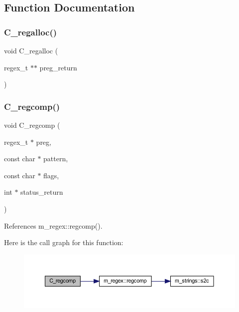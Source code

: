 \subsection{Function Documentation}
\mbox{\label{C-M__regex_8c_a749eb5df717b312d898ea0a3b279e7ca}} 
\subsubsection{\texorpdfstring{C\+\_\+regalloc()}{C\_regalloc()}}
{\footnotesize\ttfamily void C\+\_\+regalloc (\begin{DoxyParamCaption}\item[{regex\+\_\+t $\ast$$\ast$}]{preg\+\_\+return }\end{DoxyParamCaption})}

\mbox{\label{C-M__regex_8c_a3fcdbec663d5285a401e73c4cdca37be}} 
\subsubsection{\texorpdfstring{C\+\_\+regcomp()}{C\_regcomp()}}
{\footnotesize\ttfamily void C\+\_\+regcomp (\begin{DoxyParamCaption}\item[{regex\+\_\+t $\ast$}]{preg,  }\item[{const char $\ast$}]{pattern,  }\item[{const char $\ast$}]{flags,  }\item[{int $\ast$}]{status\+\_\+return }\end{DoxyParamCaption})}



References m\+\_\+regex\+::regcomp().

Here is the call graph for this function\+:
\nopagebreak
\begin{figure}[H]
\begin{center}
\leavevmode
\includegraphics[width=350pt]{C-M__regex_8c_a3fcdbec663d5285a401e73c4cdca37be_cgraph}
\end{center}
\end{figure}
\mbox{\label{C-M__regex_8c_ad4d383ae55d866605fb7ff11e8cf99d8}} 

